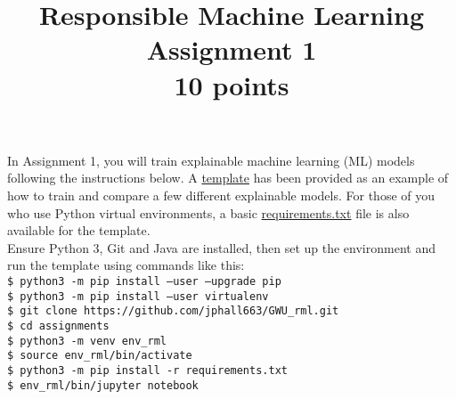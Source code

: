 \documentclass[fleqn]{article}
\title{Responsible Machine Learning\\\Large{Assignment 1}\\\Large{10 points}}
\begin{document}
\maketitle

\noindent In Assignment 1, you will train explainable machine learning (ML) models following the instructions below. A \href{https://nbviewer.jupyter.org/github/jphall663/GWU_rml/blob/master/assignments/assignment_1/assign_1_template.ipynb?flush_cache=true}{template} has been provided as an example of how to train and compare a few different explainable models. For those of you who use Python virtual environments, a basic \href{https://github.com/jphall663/GWU_rml/blob/master/assignments/requirements.txt}{requirements.txt} file is also available for the template.\\

\noindent Ensure Python 3, Git and Java are installed, then set up the environment and run the template using commands like this:\\ 
\noindent \texttt{\$ python3 -m pip install --user --upgrade pip}\\
\noindent \texttt{\$ python3 -m pip install --user virtualenv}\\
\noindent \texttt{\$ git clone https://github.com/jphall663/GWU\_rml.git}\\
\noindent \texttt{\$ cd assignments}\\
\noindent \texttt{\$ python3 -m venv env\_rml}\\
\noindent \texttt{\$ source env\_rml/bin/activate}\\
\noindent \texttt{\$ python3 -m pip install -r requirements.txt}\\
\noindent \texttt{\$ env\_rml/bin/jupyter notebook}\\
\end{document}
